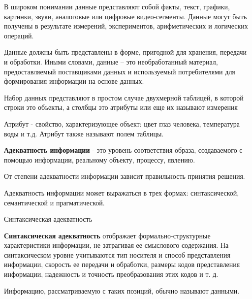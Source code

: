 \documentclass{beamer}
\begin{document}
\begin{frame}

В широком понимании данные представляют собой факты, текст,
графики, картинки, звуки, аналоговые или цифровые видео-сегменты.
Данные могут быть получены в результате измерений, экспериментов,
арифметических и логических операций.

\end{frame}

\begin{frame}
Данные должны быть представлены в форме, пригодной для 
хранения, передачи и обработки. Иными словами, данные --
это необработанный материал, предоставляемый поставщиками данных и используемый
потребителями для формирования информации на основе данных.
\end{frame}

\begin{frame}
Набор данных  представляют в простом случае двухмерной таблицей, в которой 
строки это объекты, а столбцы это атрибуты или еще их называют измерения

Атрибут - свойство, характеризующее объект: цвет глаз человека,
температура воды и т.д. Атрибут также называют полем таблицы.
\end{frame}



\begin{frame}

\textbf{Адекватность информации } - это уровень соответствия образа, создаваемого с помощью информации, реальному объекту, процессу, явлению.
 
 От степени адекватности информации зависит правильность принятия решения.

Адекватность информации может выражаться в трех формах: синтаксической, семантической и прагматической.

\end{frame}

\begin{frame}{Синтаксическая адекватность}

\textbf{Синтаксическая адекватность} отображает формально-структурные характеристики информации, не затрагивая ее смыслового содержания. 
На синтаксическом уровне учитываются тип носителя и способ представления информации, 
скорость ее передачи и обработки, размеры кодов представления информации, 
надежность и точность преобразования этих кодов и т. д. 

Информацию, рассматриваемую с таких позиций, обычно называют данными.

\end{frame}
\end{document}
